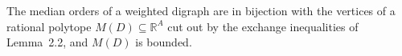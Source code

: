 \begin{theorem}\label{Bellamy19-thm-2.3}
The median orders of a weighted digraph are in bijection with the vertices of a rational polytope $M(D) \subseteq \mathbb{R}^{A}$ cut out by the exchange inequalities of Lemma~2.2, and $M(D)$ is bounded.
\end{theorem}
